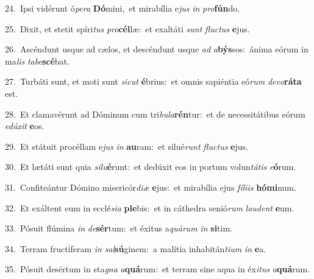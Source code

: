 {\numbfont\textcolor{\numbcolor}{24.}}~Ipsi vidérunt ó\-\textit{pe}\-\textit{ra} \textbf{Dó}\-mini,~\star et mirabília e\textit{jus} \textit{in} \textit{pro}\-\textbf{fún}do.\par
{\numbfont\textcolor{\numbcolor}{25.}}~Dixit, et stetit spíri\textit{tus} \textit{pro}\-\textbf{cél}læ:~\star et exaltáti \textit{sunt} \textit{fluc}\-\textit{tus} \textbf{e}\-jus.\par
{\numbfont\textcolor{\numbcolor}{26.}}~Ascéndunt usque ad cælos, et descéndunt usque \textit{ad} \textit{a}\-\textbf{býs}sos:~\star ánima eórum in ma\textit{lis} \textit{ta}\-\textit{be}\textbf{scé}bat.\par
{\numbfont\textcolor{\numbcolor}{27.}}~Turbáti sunt, et moti sunt \textit{sic}\-\textit{ut} \textbf{é}\-brius:~\star et omnis sapiéntia eó\textit{rum} \textit{de}\-\textit{vo}\textbf{rá}\textbf{ta} est.\par
{\numbfont\textcolor{\numbcolor}{28.}}~Et clamavérunt ad Dóminum cum tri\-\textit{bu}\-\textit{la}\textbf{rén}tur:~\star et de necessitátibus eórum \textit{e}\-\textit{dú}\textit{xit} \textbf{e}\-os.\par
{\numbfont\textcolor{\numbcolor}{29.}}~Et státuit procéllam e\textit{jus} \textit{in} \textbf{au}\-ram:~\star et silué\textit{runt} \textit{fluc}\-\textit{tus} \textbf{e}\-jus.\par
{\numbfont\textcolor{\numbcolor}{30.}}~Et lætáti sunt quia \textit{si}\-\textit{lu}\textbf{é}runt:~\star et dedúxit eos in portum volun\-\textit{tá}\-\textit{tis} \textit{e}\-\textbf{ó}rum.\par
{\numbfont\textcolor{\numbcolor}{31.}}~Confiteántur Dómino misericór\-\textit{di}\-\textit{æ} \textbf{e}\-jus:~\star et mirabília ejus \textit{fí}\-\textit{li}\textit{is} \textbf{hó}\-\textbf{mi}num.\par
{\numbfont\textcolor{\numbcolor}{32.}}~Et exáltent eum in ecclé\-\textit{si}\-\textit{a} \textbf{ple}\-bis:~\star et in cáthedra senió\textit{rum} \textit{lau}\-\textit{dent} \textbf{e}\-um.\par
{\numbfont\textcolor{\numbcolor}{33.}}~Pósuit flúmina \textit{in} \textit{de}\-\textbf{sér}tum:~\star et éxitus a\-\textit{quá}\-\textit{rum} \textit{in} \textbf{si}\-tim.\par
{\numbfont\textcolor{\numbcolor}{34.}}~Terram fructíferam \textit{in} \textit{sal}\-\textbf{sú}ginem:~\star a malítia inhabitán\-\textit{ti}\-\textit{um} \textit{in} \textbf{e}\-a.\par
{\numbfont\textcolor{\numbcolor}{35.}}~Pósuit desértum in sta\textit{gna} \textit{a}\-\textbf{quá}rum:~\star et terram sine aqua in éx\-\textit{i}\-\textit{tus} \textit{a}\-\textbf{quá}rum.\par
